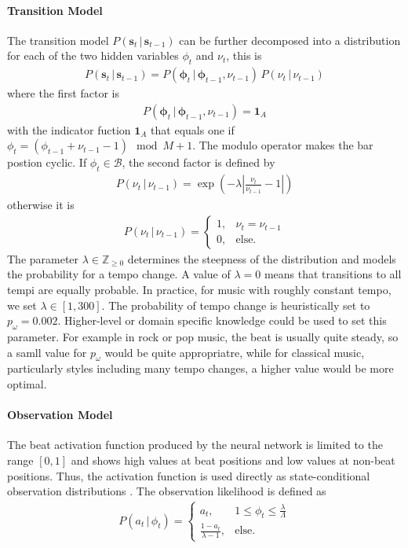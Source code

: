 \documentclass{scrartcl}
\begin{document}
\paragraph{Transition Model} The transition model $P(\mathbf s_t\,|\,\mathbf s_{t-1})$ can be further decomposed into a distribution for each of the two hidden variables $\phi_t$ and $\nu_t$, this is
\begin{align}
P(\mathbf s_t\,|\,\mathbf s_{t-1}) = P(\mathbf \phi_t\,|\,\mathbf \phi_{t-1}, \nu_{t-1}) \, P(\nu_t \, |\, \nu_{t-1}) 
\end{align} 
where the first factor is
\begin{align}
P(\mathbf \phi_t\,|\,\mathbf \phi_{t-1}, \nu_{t-1}) = \mathbf 1_A
\end{align} 
with the indicator fuction $\mathbf 1_A$ that equals one if $\phi_t = (\phi_{t-1}+\nu_{t-1}-1)\mod M+1$. The modulo operator makes the bar postion cyclic. If $\phi_t \in \mathcal B$, the second factor is defined by
\begin{align}
P(\nu_t \, |\, \nu_{t-1}) = \exp \left( -\lambda \left| \frac{\nu_{t}}{\nu_{t-1}} -1 \right| \right)
\end{align} 
otherwise it is
\begin{align}
P(\nu_t \, |\, \nu_{t-1}) = \begin{cases}
    1, &\nu_t = \nu_{t-1}\\
    0, &\text{else.} 
\end{cases}
\end{align} 
The parameter $\lambda \in \mathbb Z_{\geq0}$ determines the steepness of the distribution and models the probability for a tempo change. A value of $\lambda = 0$ means that transitions to all tempi are equally probable. In practice, for music with roughly constant tempo, we set $\lambda \in [1, 300]$. The probability of tempo change is heuristically set to $p_\omega = 0.002$. Higher-level or domain specific knowledge could be used to set this parameter. For example in rock or pop music, the beat is usually quite steady, so a samll value for $p_\omega$ would be quite appropriatre, while for classical music, particularly styles including many tempo changes, a higher value would be more optimal.


\paragraph{Observation Model}
The beat activation function produced by the neural network is limited to the range $[0, 1]$ and shows high values at beat positions and low values at non-beat positions. Thus, the activation function is used directly as state-conditional observation distributions \cite{Degara2012}. The observation likelihood is defined as 
\begin{align}
P(a_t\,|\,\phi_t) = \begin{cases}
    a_t, &1 \leq \phi_t\leq \frac{\lambda}{\Lambda}\\
    \frac{1-a_t}{\lambda-1}, &\text{else}.    
\end{cases}
\end{align} 
\end{document}
